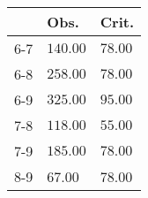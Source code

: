 \begin{table}[ht]
\centering
\begin{tabular}{rll}
  \hline
 & Obs. & Crit. \\ 
  \hline
6-7 & \(\mathbf{140.00}\) & \(\mathbf{78.00}\) \\ 
  6-8 & \(\mathbf{258.00}\) & \(\mathbf{78.00}\) \\ 
  6-9 & \(\mathbf{325.00}\) & \(\mathbf{95.00}\) \\ 
  7-8 & \(\mathbf{118.00}\) & \(\mathbf{55.00}\) \\ 
  7-9 & \(\mathbf{185.00}\) & \(\mathbf{78.00}\) \\ 
  8-9 & 67.00 & 78.00 \\ 
   \hline
\end{tabular}
\end{table}
